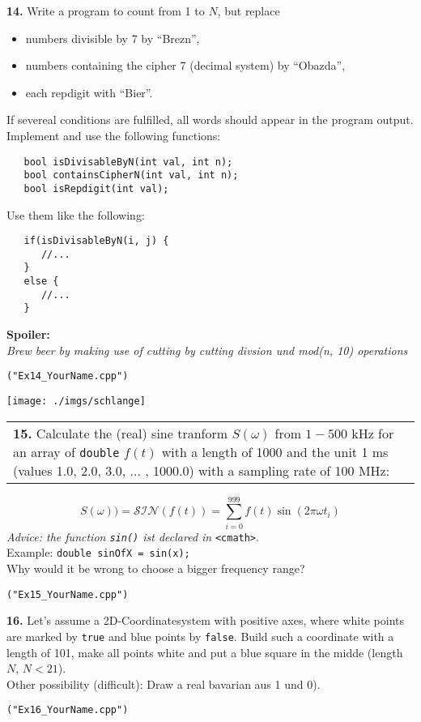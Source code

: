 \documentclass[paper=A4, pagesize, DIV=calc, smallheadings,
fontsize=11pt, expansion=false]{scrreprt}
\begin{document}
\textbf{14.} Write a program to count from 1 to $N$, but replace
  \begin{itemize}
  \item numbers divisible by 7 by ``Brezn'',
  \item numbers containing the cipher 7 (decimal system) by ``Obazda'',
  \item each repdigit with ``Bier''.
  \end{itemize}
  If severeal conditions are fulfilled, all words should appear in the program output.
  Implement and use the following functions:
\begin{verbatim}
   bool isDivisableByN(int val, int n); 
   bool containsCipherN(int val, int n);
   bool isRepdigit(int val);
\end{verbatim}
Use them like the following:
\begin{verbatim}
   if(isDivisableByN(i, j) {
      //...
   }
   else {
      //...
   }
\end{verbatim}
  \Large
  \textbf{Spoiler:} \\
  \tiny
  \emph{Brew beer by making use of cutting by cutting divsion und mod(n, 10) operations} 
  \normalsize
\begin{verbatim}
("Ex14_YourName.cpp")
\end{verbatim}


\newpage
\begin{minipage}[H]{0.3\linewidth}
\texttt{[image: ./imgs/schlange]}
\end{minipage}
\begin{tabular}{m{30em}}
\textbf{15.} 
Calculate the (real) sine tranform  $S(\omega)$ from $1 - 500$ kHz for an  array of \texttt{double} $f(t)$ with a length of 1000 and the unit 1 ms (values 1.0, 2.0, 3.0, ... , 1000.0) with a sampling rate of 100 MHz:
\end{tabular}
  \[ S(\omega)) = \mathcal{SIN}(f(t))  = \sum_{i=0}^{999} f(t) \sin{(2 \pi \omega t_i)}\]
  \emph{Advice: the function \texttt{sin()} ist declared in } \texttt{\textless cmath\textgreater}.\\
  Example:
  \texttt{double sinOfX = sin(x);}\\
  Why would it be wrong to choose a bigger frequency range?
\begin{verbatim}
("Ex15_YourName.cpp")
\end{verbatim}
  
  \textbf{16.}
  Let's assume a 2D-Coordinatesystem with positive axes, where white points are marked by \texttt{true} and blue points by \texttt{false}.
  Build such a coordinate with a length of 101, make all points white and put a blue square in the midde (length $N$, $N < 21$).\\
  Other possibility (difficult):  Draw a real bavarian  aus 1 und 0).
\begin{verbatim}
("Ex16_YourName.cpp")
\end{verbatim}
\end{document}
